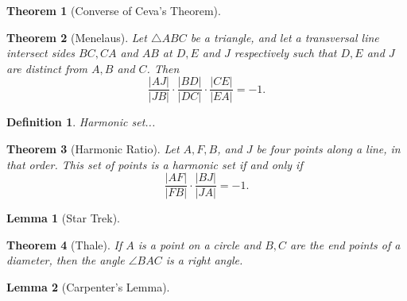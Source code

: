 \documentclass[12pt]{amsart}
\newtheorem*{theorem}{Theorem}
\newtheorem*{lemma}{Lemma}
\newtheorem*{definition}{Definition}
\theoremstyle{remark}
\newtheorem*{basic notion}{Basic Notion}
\theoremstyle{mycomment}
\begin{document}
\begin{theorem}[Converse of Ceva's Theorem]
\end{theorem}
\begin{theorem}[Menelaus] Let $\triangle ABC$ be a triangle, and let a transversal line intersect sides $BC, CA$ and $AB$ at $D, E$ and $J$ respectively such that $D, E$ and $J$ are distinct from $A, B$ and $C$. Then $$\frac{|AJ|}{|JB|}\cdot\frac{|BD|}{|DC|}\cdot\frac{|CE|}{|EA|}=-1.$$
\end{theorem}
\begin{definition} Harmonic set...\end{definition}
\begin{theorem}[Harmonic Ratio] Let $A, F, B$, and $J$ be four points along a line, in that order. This set of points is a harmonic set if and only if $$\frac{|AF|}{|FB|}\cdot\frac{|BJ|}{|JA|}=-1.$$\end{theorem}
\begin{lemma}[Star Trek]
\end{lemma}
\begin{theorem}[Thale] If $A$ is a point on a circle and $B,C$ are the end points of a diameter, then the angle $\angle BAC$ is  a right angle.\end{theorem}
\begin{lemma}[Carpenter's Lemma]
\end{lemma}
 
\end{document}
